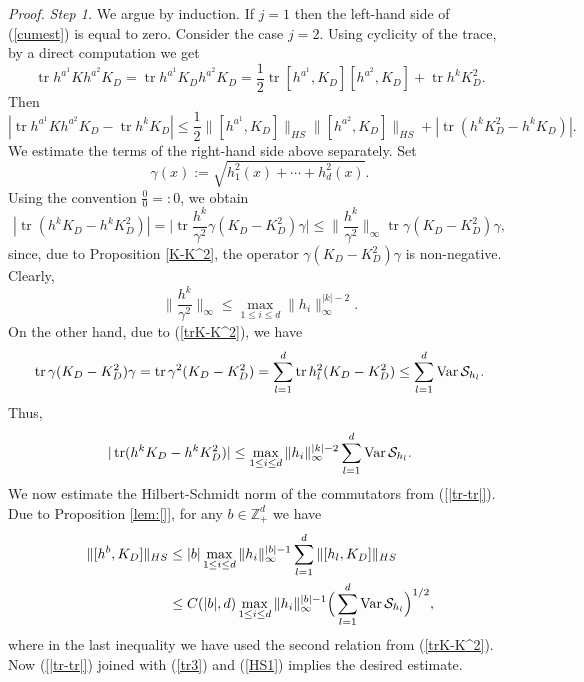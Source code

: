\documentclass{article}
\numberwithin{equation}{section}
\newcommand{\SSS}{{\cal S}}
\newcommand{\ga}{\gamma}
\newcommand{\tr}{\operatorname{tr}}
\newcommand{\Var}{\operatorname{Var}}
\newcommand{\fr}{\frac}
\newcommand{\sli}{\sum\limits}
\newcommand{\lbl}{\label}
\newcommand{\rprop}{Proposition \nolinebreak}
\newcommand{\bee}{\begin{equation}}
\newcommand{\eee}{\end{equation}}
\newcommand{\non}{\nonumber}
\newcommand{\Zp}{\mathbb{Z}^d_+}
\begin{document}
{\it Proof.}
{\it Step 1.} We argue by induction.
If $j=1$ then the left-hand side of (\ref{cumest}) is equal to zero. Consider the case $j=2$.
Using cyclicity of the trace, by a direct computation we get
$$
\tr h^{a^1}K h^{a^2}K_D
=\tr h^{a^1}K_D h^{a^2}K_D
= \frac12\tr[h^{a^1},K_D][h^{a^2},K_D] + \tr{h^kK_D^2}.
$$
Then
\bee\lbl{|tr-tr|}
|\tr h^{a^1}Kh^{a^2}K_D-\tr h^kK_D|\leq \fr12 \|[h^{a^1},K_D]\|_{HS} \|[h^{a^2},K_D]\|_{HS}
+ |\tr (h^k K_D^2 - h^kK_D)|.
\eee
We estimate the terms of the right-hand side above separately.
Set
\bee\lbl{gaaa}
\ga(x):=\sqrt{h_1^2(x)+\cdots+h_d^2(x)}.
\eee
Using the convention $\fr{0}{0}=:0$, we obtain
\bee\lbl{trKK2}
|\tr (h^k K_D - h^kK_D^2)|=\Big|\tr \fr{h^k}{\ga^2}\ga(K_D - K_D^2)\ga\Big|
\leq \Big\|\fr{h^k}{\ga^2}\Big\|_\infty \tr \ga(K_D - K_D^2)\ga,
\eee
since, due to \rprop\ref{K-K^2}, the operator $\ga(K_D - K_D^2)\ga$ is non-negative.
Clearly,
\bee\non
\Big\|\fr{h^k}{\ga^2}\Big\|_\infty\leq \max\limits_{1\leq i\leq d} \|h_i\|_\infty^{|k|-2}.
\eee
On the other hand, due to (\ref{trK-K^2}), we have
\bee\lbl{trKK21}
\tr \ga(K_D - K_D^2)\ga = \tr \ga^2(K_D - K_D^2)=
\sli_{l=1}^d\tr h_l^2(K_D-K_D^2)
\leq\sli_{l=1}^d\Var\SSS_{h_l}.
\eee
Thus,
\bee\lbl{tr3}
|\tr (h^k K_D - h^kK_D^2)|\leq \max\limits_{1\leq i\leq d}
\|h_i\|_\infty^{|k|-2}\sli_{l=1}^d\Var\SSS_{h_l}.
\eee
We now  estimate the Hilbert-Schmidt norm of the commutators from (\ref{|tr-tr|}). Due to Proposition \ref{lem:[]}, for any $b\in\Zp$ we
have
\begin{align}\non
\|[h^{b},K_D]\|_{HS}&\leq
|b|\max\limits_{1\leq i\leq d}\|h_i\|_\infty^{|b|-1}
\sli_{l=1}^d\|[h_l,K_D]\|_{HS} \\ \lbl{HS1}
&\leq C(|b|, d)\max\limits_{1\leq i\leq d}\|h_i\|_\infty^{|b|-1}
\Big(\sli_{l=1}^d\Var\SSS_{h_l}\Big)^{1/2},
\end{align}
where in the last inequality we have used the second relation from (\ref{trK-K^2}).
Now (\ref{|tr-tr|}) joined with (\ref{tr3}) and (\ref{HS1}) implies the desired estimate.
\end{document}
